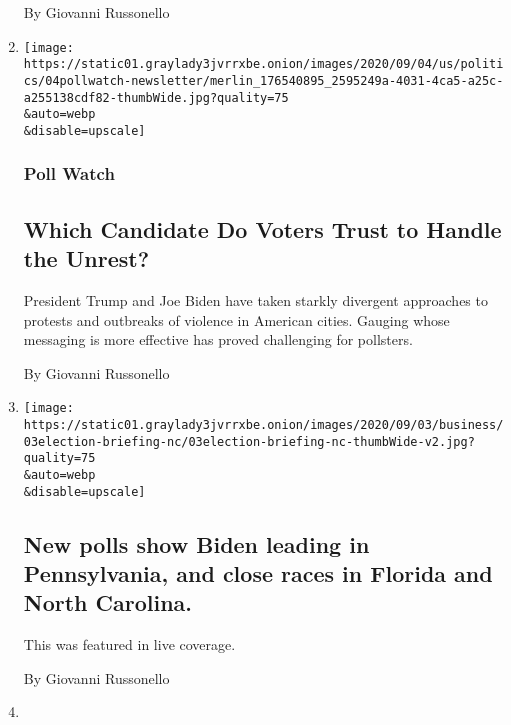 \begin{enumerate}
  By Giovanni Russonello
\item
  \href{/2020/09/04/us/politics/trump-biden-protests-polling.html}{}

  \texttt{[image: https://static01.graylady3jvrrxbe.onion/images/2020/09/04/us/politics/04pollwatch-newsletter/merlin\_176540895\_2595249a-4031-4ca5-a25c-a255138cdf82-thumbWide.jpg?quality=75\\\&auto=webp\\\&disable=upscale]}

  \hypertarget{poll-watch}{%
  \subsubsection{Poll Watch}\label{poll-watch}}

  \hypertarget{which-candidate-do-voters-trust-to-handle-the-unrest}{%
  \subsection{Which Candidate Do Voters Trust to Handle the
  Unrest?}\label{which-candidate-do-voters-trust-to-handle-the-unrest}}

  President Trump and Joe Biden have taken starkly divergent approaches
  to protests and outbreaks of violence in American cities. Gauging
  whose messaging is more effective has proved challenging for
  pollsters.

  By Giovanni Russonello
\item
  \href{/live/2020/09/03/us/trump-vs-biden/new-polls-show-biden-leading-in-pennsylvania-and-close-races-in-florida-and-north-carolina}{}

  \texttt{[image: https://static01.graylady3jvrrxbe.onion/images/2020/09/03/business/03election-briefing-nc/03election-briefing-nc-thumbWide-v2.jpg?quality=75\\\&auto=webp\\\&disable=upscale]}

  \hypertarget{new-polls-show-biden-leading-in-pennsylvania-and-close-races-in-florida-and-north-carolina}{%
  \subsection{New polls show Biden leading in Pennsylvania, and close
  races in Florida and North
  Carolina.}\label{new-polls-show-biden-leading-in-pennsylvania-and-close-races-in-florida-and-north-carolina}}

  This was featured in live coverage.

  By Giovanni Russonello
\item
  \href{/2020/09/03/arts/music/jazz-protest-academia.html}{}


\end{enumerate}
